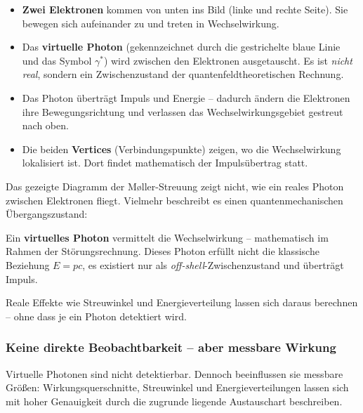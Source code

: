 \begin{itemize}
	\item \textbf{Zwei Elektronen} kommen von unten ins Bild (linke und rechte Seite). Sie bewegen sich aufeinander zu und treten in Wechselwirkung.
	
	\item Das \textbf{virtuelle Photon} (gekennzeichnet durch die gestrichelte blaue Linie und das Symbol $\gamma^*$) wird zwischen den Elektronen ausgetauscht. Es ist \emph{nicht real}, sondern ein Zwischenzustand der quantenfeldtheoretischen Rechnung.
	
	\item Das Photon überträgt Impuls und Energie – dadurch ändern die Elektronen ihre Bewegungsrichtung und verlassen das Wechselwirkungsgebiet gestreut nach oben.
	
	\item Die beiden \textbf{Vertices} (Verbindungspunkte) zeigen, wo die Wechselwirkung lokalisiert ist. Dort findet mathematisch der Impulsübertrag statt.
\end{itemize}

\begin{tcolorbox}[didaktikbox, title=Was zeigt das Feynman-Diagramm wirklich?]
	\label{box:Was zeigt das Feynman-Diagramm wirklich}
	Das gezeigte Diagramm der Møller-Streuung zeigt nicht, wie ein reales Photon zwischen Elektronen fliegt. Vielmehr beschreibt es einen quantenmechanischen Übergangszustand:
	
	Ein \textbf{virtuelles Photon} vermittelt die Wechselwirkung – mathematisch im Rahmen der Störungsrechnung. Dieses Photon erfüllt nicht die klassische Beziehung $E = pc$, es existiert nur als \emph{off-shell}-Zwischenzustand und überträgt Impuls.
	
	Reale Effekte wie Streuwinkel und Energieverteilung lassen sich daraus berechnen – ohne dass je ein Photon detektiert wird.
\end{tcolorbox}

\subsubsection*{Keine direkte Beobachtbarkeit – aber messbare Wirkung}
Virtuelle Photonen sind nicht detektierbar. Dennoch beeinflussen sie messbare Größen: Wirkungsquerschnitte, Streuwinkel und Energieverteilungen lassen sich mit hoher Genauigkeit durch die zugrunde liegende Austauschart beschreiben.

